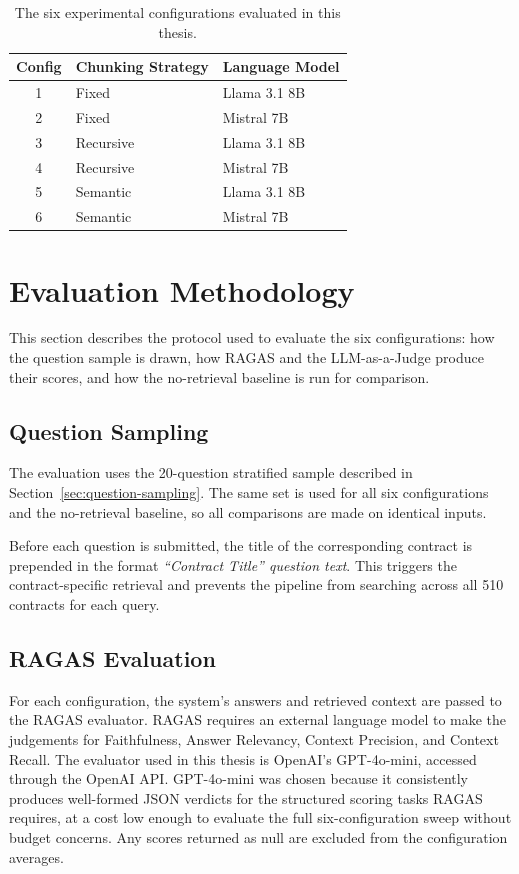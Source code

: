 \begin{table}[h!]
\centering
\begin{tabular}{cll}
\hline
\textbf{Config} & \textbf{Chunking Strategy} & \textbf{Language Model} \\
\hline
1 & Fixed     & Llama 3.1 8B \\
2 & Fixed     & Mistral 7B   \\
3 & Recursive & Llama 3.1 8B \\
4 & Recursive & Mistral 7B   \\
5 & Semantic  & Llama 3.1 8B \\
6 & Semantic  & Mistral 7B   \\
\hline
\end{tabular}
\caption{The six experimental configurations evaluated in this thesis.}
\label{tab:configs}
\end{table}

\newpage
\section{Evaluation Methodology}

This section describes the protocol used to evaluate the six configurations: how the question sample is drawn, how RAGAS and the LLM-as-a-Judge produce their scores, and how the no-retrieval baseline is run for comparison.

\subsection{Question Sampling}
\label{sec:eval-sampling}

The evaluation uses the 20-question stratified sample described in Section~\ref{sec:question-sampling}. The same set is used for all six configurations and the
no-retrieval baseline, so all comparisons are made on identical inputs.


Before each question is submitted, the title of the corresponding contract is
prepended in the format \textit{``Contract Title'' question text}. This triggers
the contract-specific retrieval and prevents the pipeline from searching across all 510 contracts for each query.

\subsection{RAGAS Evaluation}

For each configuration, the system's answers and retrieved context are passed to the RAGAS evaluator. RAGAS requires an external language model to make the judgements for Faithfulness, Answer Relevancy, Context Precision, and Context Recall. The evaluator used in this thesis is OpenAI's GPT-4o-mini, accessed through the OpenAI API. GPT-4o-mini was chosen because it consistently produces well-formed JSON verdicts for the structured scoring tasks RAGAS requires, at a cost low enough to evaluate the full six-configuration sweep without budget concerns. Any scores returned as null are excluded from the configuration averages.

